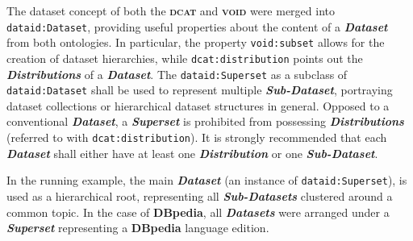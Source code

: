 \documentclass[a4paper,english,twoside,BCOR1.5cm,headsepline,DIV12,appendixprefix,final,12pt]{scrbook}
\newcommand{\void}{{\scshape\bfseries void}\xspace}
\newcommand{\dcat}{{\scshape\bfseries dcat}\xspace}
\newcommand{\dbpedia}{{\ttfamily\bfseries DBpedia}\xspace}
\newcommand{\prop}[1]{{{\texttt{#1}}}}
\newcommand{\important}[1]{\textbf{\textit{#1}}}
\begin{document}
The dataset concept of both the \dcat and \void were merged into \prop{dataid:Dataset}, providing useful properties about the content of a \important{Dataset} from both ontologies. In particular, the property \prop{void:subset} allows for the creation of dataset hierarchies, while \prop{dcat:distribution} points out the \important{Distributions} of a \important{Dataset}. The \prop{dataid:Superset} as a subclass of \prop{dataid:Dataset} shall be used to represent multiple \important{Sub-Dataset}, portraying dataset collections or hierarchical dataset structures in general. Opposed to a conventional \important{Dataset}, a \important{Superset} is prohibited from possessing \important{Distributions} (referred to with \prop{dcat:distribution}). It is strongly recommended that each \important{Dataset} shall either have at least one \important{Distribution} or one \important{Sub-Dataset}. 

In the running example, the main \important{Dataset} (an instance of \prop{dataid:Superset}), is used as a hierarchical root, representing all \important{Sub-Datasets} clustered around a common topic. In the case of \dbpedia, all \important{Datasets} were arranged under a \important{Superset} representing a \dbpedia language edition.
\end{document}
